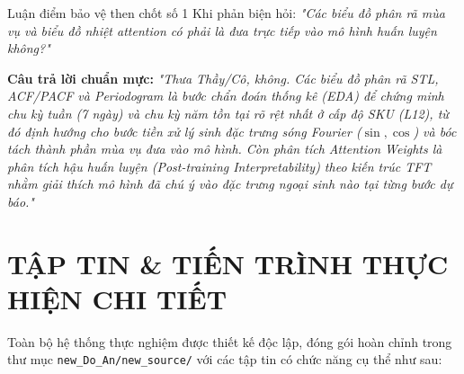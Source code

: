 \documentclass[12pt,a4paper,oneside]{article}
\begin{document}
\begin{defensebox}{Luận điểm bảo vệ then chốt số 1}
    Khi phản biện hỏi: \textit{"Các biểu đồ phân rã mùa vụ và biểu đồ nhiệt attention có phải là đưa trực tiếp vào mô hình huấn luyện không?"}
    
    \textbf{Câu trả lời chuẩn mực:} \textit{"Thưa Thầy/Cô, không. Các biểu đồ phân rã STL, ACF/PACF và Periodogram là bước chẩn đoán thống kê (EDA) để chứng minh chu kỳ tuần (7 ngày) và chu kỳ năm tồn tại rõ rệt nhất ở cấp độ SKU (L12), từ đó định hướng cho bước tiền xử lý sinh đặc trưng sóng Fourier ($\sin, \cos$) và bóc tách thành phần mùa vụ đưa vào mô hình. Còn phân tích Attention Weights là phân tích hậu huấn luyện (Post-training Interpretability) theo kiến trúc TFT nhằm giải thích mô hình đã chú ý vào đặc trưng ngoại sinh nào tại từng bước dự báo."}
\end{defensebox}

\newpage
\section{TẬP TIN \& TIẾN TRÌNH THỰC HIỆN CHI TIẾT}
\label{sec:tap_tin_va_tien_trinh}

Toàn bộ hệ thống thực nghiệm được thiết kế độc lập, đóng gói hoàn chỉnh trong thư mục \texttt{new\_Do\_An/new\_source/} với các tập tin có chức năng cụ thể như sau:
\end{document}
